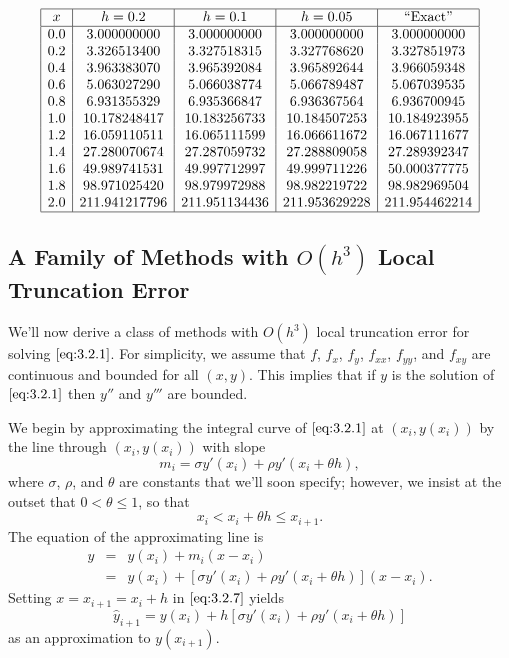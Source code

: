 \documentclass{ximera}
\begin{document}
\begin{example}
\begin{explanation}
$$
\begin{array}{|c|c|c|c|c|}
\hline
x&
h=0.2&
h=0.1&
h=0.05&
\text{``Exact''}\\ \hline
0.0 &   3.000000000 &  3.000000000  &   3.000000000 &   3.000000000 \\
0.2 &   3.326513400 &  3.327518315  &   3.327768620 &   3.327851973 \\
0.4 &   3.963383070 &  3.965392084  &   3.965892644 &   3.966059348 \\
0.6 &   5.063027290 &  5.066038774  &   5.066789487 &   5.067039535 \\
0.8 &   6.931355329 &  6.935366847  &   6.936367564 &   6.936700945 \\
1.0 &  10.178248417 & 10.183256733  &  10.184507253 &  10.184923955 \\
1.2 &  16.059110511 & 16.065111599  &  16.066611672 &  16.067111677 \\
1.4 &  27.280070674 & 27.287059732  &  27.288809058 &  27.289392347 \\
1.6 &  49.989741531 & 49.997712997  &  49.999711226 &  50.000377775 \\
1.8 &  98.971025420 & 98.979972988  &  98.982219722 &  98.982969504 \\
2.0 & 211.941217796 &211.951134436  & 211.953629228 & 211.954462214 \\
\hline
\end{array}
$$
\end{explanation}
\end{example}


\subsection*{A Family of Methods with $O(h^3)$ Local Truncation Error}

We'll now derive a class of methods with $O(h^3)$ local truncation
error for solving $\eqref{eq:3.2.1}$. For simplicity, we
assume that $f$, $f_x$, $f_y$, $f_{xx}$, $f_{yy}$, and $f_{xy}$ are
continuous and bounded for all $(x,y)$. This implies that if $y$ is
the solution of $\eqref{eq:3.2.1}$ then $y''$ and $y'''$ are bounded.

We begin by approximating the integral curve of $\eqref{eq:3.2.1}$ at
$(x_i,y(x_i))$ by the line through $(x_i,y(x_i))$ with slope
$$
m_i=\sigma y'(x_i)+\rho y'(x_i+\theta h),
$$
where $\sigma$, $\rho$, and $\theta$ are constants that we'll soon
specify;     however, we insist at the outset that $0<\theta\leq 1$, so
that
$$
x_i<x_i+\theta h\leq x_{i+1}.
$$
The equation of the approximating line is
\begin{equation} \label{eq:3.2.7}
\begin{array}{rcl}
y&=&y(x_i)+m_i(x-x_i)\\
&=&y(x_i)+\left[\sigma y'(x_i)+\rho y'(x_i+\theta h)\right](x-x_i).
\end{array}
\end{equation}
Setting $x=x_{i+1}=x_i+h$ in $\eqref{eq:3.2.7}$ yields
$$
\hat y_{i+1}=y(x_i)+h\left[\sigma y'(x_i)+\rho y'(x_i+\theta h)\right]
$$
as an approximation to $y(x_{i+1})$.
\end{document}
